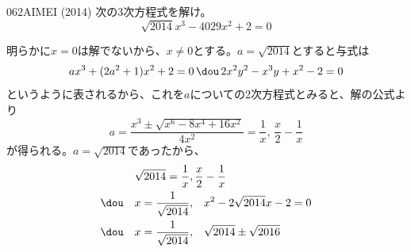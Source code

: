 \begin{prob}{062}{}{AIMEI (2014)}
 次の3次方程式を解け。\\
 \[ \sqrt{2014}x^3-4029x^2+2=0 \]
\end{prob}
明らかに$x=0$は解でないから、$x\neq 0$とする。$a=\sqrt{2014}$とすると与式は
\[ ax^3+(2a^2+1)x^2+2=0 \,\dou\, 2x^2y^2-x^3y+x^2-2=0 \]
というように表されるから、これを$a$についての2次方程式とみると、解の公式より
\[ a=\frac{x^3\pm\sqrt{x^6-8x^4+16x^2}}{4x^2}=\frac{1}{x},\, \frac{x}{2}-\frac{1}{x} \]
が得られる。$a=\sqrt{2014}$であったから、
\begin{align*}
 \sqrt{2014}=\frac{1}{x},&\, \frac{x}{2}-\frac{1}{x} \\
 \dou\quad x=\frac{1}{\sqrt{2014}},&\quad x^2-2\sqrt{2014}x-2=0 \\
 \dou\quad x=\frac{1}{\sqrt{2014}},&\quad \sqrt{2014}\pm\sqrt{2016}
\end{align*}